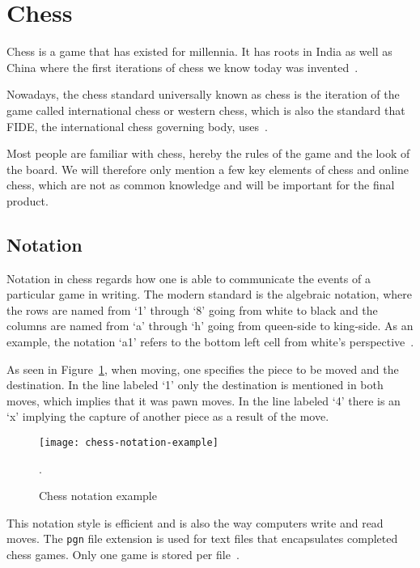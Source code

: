 \section{Chess}\label{sec:chess}

Chess is a game that has existed for millennia.
It has roots in India as well as China where the first iterations of chess we know today was invented~\cite{murray1913}.

Nowadays, the chess standard universally known as chess is the iteration of the game called international chess or
western chess, which is also the standard that FIDE, the international chess governing body, uses~\cite{fide2024}.

Most people are familiar with chess, hereby the rules of the game and the look of the board.
We will therefore only mention a few key elements of chess and online chess, which are not as common knowledge and will
be important for the final product.

\subsection{Notation}\label{subsec:notation}

Notation in chess regards how one is able to communicate the events of a particular game in writing.
The modern standard is the algebraic notation, where the rows are named from `1' through `8' going from white to black
and the columns are named from `a' through `h' going from queen-side to king-side.
As an example, the notation `a1' refers to the bottom left cell from white's perspective~\cite{pickel2022}.

As seen in Figure~\ref{fig:chess-notation-example}, when moving, one specifies the piece to be moved and the
destination.
In the line labeled `1' only the destination is mentioned in both moves, which implies that it was pawn moves.
In the line labeled `4' there is an `x' implying the capture of another piece as a result of the move.

\begin{figure}[h]
    \centering
    \texttt{[image: chess-notation-example]}
    \caption{Chess notation example~\cite{chess.com2024}}.\label{fig:chess-notation-example}
\end{figure}

This notation style is efficient and is also the way computers write and read moves.
The \lstinline{pgn} file extension is used for text files that encapsulates completed chess games.
Only one game is stored per file~\cite{chess.com2024}.

